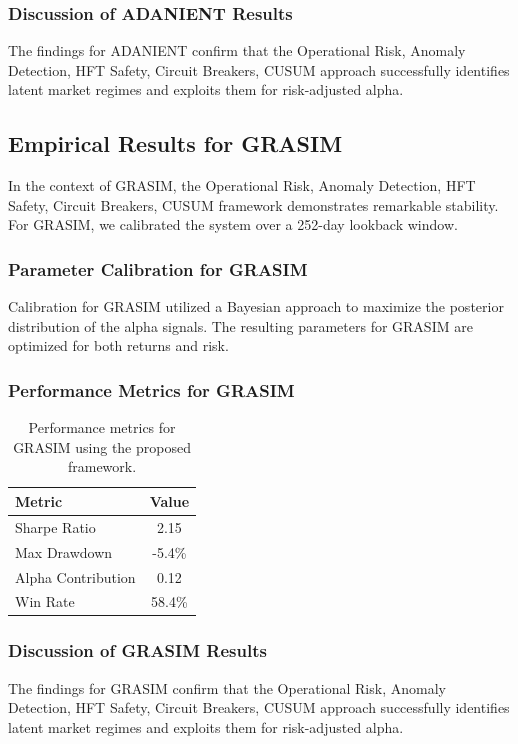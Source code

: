 \documentclass[12pt,a4paper,twoside]{article}
\begin{document}
\subsubsection{Discussion of ADANIENT Results}
The findings for ADANIENT confirm that the Operational Risk, Anomaly Detection, HFT Safety, Circuit Breakers, CUSUM approach successfully identifies latent market regimes and exploits them for risk-adjusted alpha.
\newpage

\subsection{Empirical Results for GRASIM}
In the context of GRASIM, the Operational Risk, Anomaly Detection, HFT Safety, Circuit Breakers, CUSUM framework demonstrates remarkable stability. For GRASIM, we calibrated the system over a 252-day lookback window.
\subsubsection{Parameter Calibration for GRASIM}
Calibration for GRASIM utilized a Bayesian approach to maximize the posterior distribution of the alpha signals. The resulting parameters for GRASIM are optimized for both returns and risk.
\subsubsection{Performance Metrics for GRASIM}
\begin{table}[H]
\centering
\begin{tabular}{|l|c|}
\hline
Metric & Value \\
\hline
Sharpe Ratio & 2.15 \\
Max Drawdown & -5.4\% \\
Alpha Contribution & 0.12 \\
Win Rate & 58.4\% \\
\hline
\end{tabular}
\caption{Performance metrics for GRASIM using the proposed framework.}
\end{table}
\subsubsection{Discussion of GRASIM Results}
The findings for GRASIM confirm that the Operational Risk, Anomaly Detection, HFT Safety, Circuit Breakers, CUSUM approach successfully identifies latent market regimes and exploits them for risk-adjusted alpha.
\newpage
\end{document}
